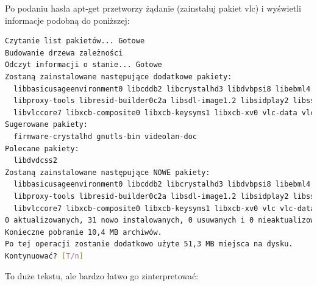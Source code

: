 Po podaniu hasła apt-get przetworzy żądanie (zainstaluj pakiet vlc) i wyświetli informacje podobną do poniższej:

\begin{lstlisting}[language=bash]
Czytanie list pakietów... Gotowe
Budowanie drzewa zależności       
Odczyt informacji o stanie... Gotowe
Zostaną zainstalowane następujące dodatkowe pakiety:
  libbasicusageenvironment0 libcddb2 libcrystalhd3 libdvbpsi8 libebml4 libgnutls28 libgroupsock1 libhogweed2 libiso9660-8 liblivemedia23 libmatroska6
  libproxy-tools libresid-builder0c2a libsdl-image1.2 libsidplay2 libssh2-1 libtar0 libupnp6 libusageenvironment1 libva-x11-1 libvcdinfo0 libvlc5
  libvlccore7 libxcb-composite0 libxcb-keysyms1 libxcb-xv0 vlc-data vlc-nox vlc-plugin-notify vlc-plugin-pulse
Sugerowane pakiety:
  firmware-crystalhd gnutls-bin videolan-doc
Polecane pakiety:
  libdvdcss2
Zostaną zainstalowane następujące NOWE pakiety:
  libbasicusageenvironment0 libcddb2 libcrystalhd3 libdvbpsi8 libebml4 libgnutls28 libgroupsock1 libhogweed2 libiso9660-8 liblivemedia23 libmatroska6
  libproxy-tools libresid-builder0c2a libsdl-image1.2 libsidplay2 libssh2-1 libtar0 libupnp6 libusageenvironment1 libva-x11-1 libvcdinfo0 libvlc5
  libvlccore7 libxcb-composite0 libxcb-keysyms1 libxcb-xv0 vlc vlc-data vlc-nox vlc-plugin-notify vlc-plugin-pulse
0 aktualizowanych, 31 nowo instalowanych, 0 usuwanych i 0 nieaktualizowanych.
Konieczne pobranie 10,4 MB archiwów.
Po tej operacji zostanie dodatkowo użyte 51,3 MB miejsca na dysku.
Kontynuować? [T/n] 
\end{lstlisting}

To duże tekstu, ale bardzo łatwo go zinterpretować:

